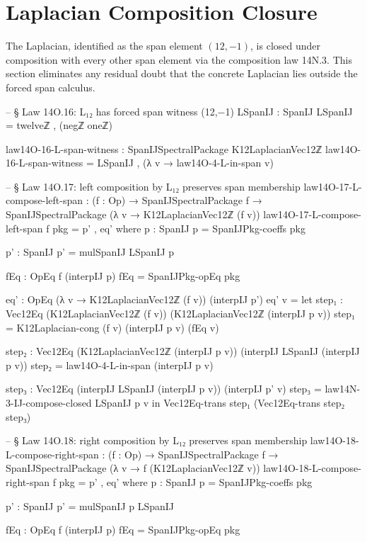 \documentclass[11pt,a4paper]{book}
\begin{document}
\section{Laplacian Composition Closure}

The Laplacian, identified as the span element $(12,-1)$,
is closed under composition with every other span element
via the composition law 14N.3.  This section eliminates any residual doubt
that the concrete Laplacian lies outside the forced span calculus.

\begin{code}
-- § Law 14O.16: L₁₂ has forced span witness (12,−1)
LSpanIJ : SpanIJ
LSpanIJ = twelveℤ , (negℤ oneℤ)

law14O-16-L-span-witness : SpanIJSpectralPackage K12LaplacianVec12ℤ
law14O-16-L-span-witness = LSpanIJ , (λ v → law14O-4-L-in-span v)

-- § Law 14O.17: left composition by L₁₂ preserves span membership
law14O-17-L-compose-left-span : (f : Op) → SpanIJSpectralPackage f → SpanIJSpectralPackage (λ v → K12LaplacianVec12ℤ (f v))
law14O-17-L-compose-left-span f pkg = p' , eq'
  where
    p : SpanIJ
    p = SpanIJPkg-coeffs pkg

    p' : SpanIJ
    p' = mulSpanIJ LSpanIJ p

    fEq : OpEq f (interpIJ p)
    fEq = SpanIJPkg-opEq pkg

    eq' : OpEq (λ v → K12LaplacianVec12ℤ (f v)) (interpIJ p')
    eq' v =
      let
        step₁ : Vec12Eq (K12LaplacianVec12ℤ (f v)) (K12LaplacianVec12ℤ (interpIJ p v))
        step₁ = K12Laplacian-cong (f v) (interpIJ p v) (fEq v)

        step₂ : Vec12Eq (K12LaplacianVec12ℤ (interpIJ p v)) (interpIJ LSpanIJ (interpIJ p v))
        step₂ = law14O-4-L-in-span (interpIJ p v)

        step₃ : Vec12Eq (interpIJ LSpanIJ (interpIJ p v)) (interpIJ p' v)
        step₃ = law14N-3-IJ-compose-closed LSpanIJ p v
      in
      Vec12Eq-trans step₁ (Vec12Eq-trans step₂ step₃)

-- § Law 14O.18: right composition by L₁₂ preserves span membership
law14O-18-L-compose-right-span : (f : Op) → SpanIJSpectralPackage f → SpanIJSpectralPackage (λ v → f (K12LaplacianVec12ℤ v))
law14O-18-L-compose-right-span f pkg = p' , eq'
  where
    p : SpanIJ
    p = SpanIJPkg-coeffs pkg

    p' : SpanIJ
    p' = mulSpanIJ p LSpanIJ

    fEq : OpEq f (interpIJ p)
    fEq = SpanIJPkg-opEq pkg


\end{code}
\end{document}

